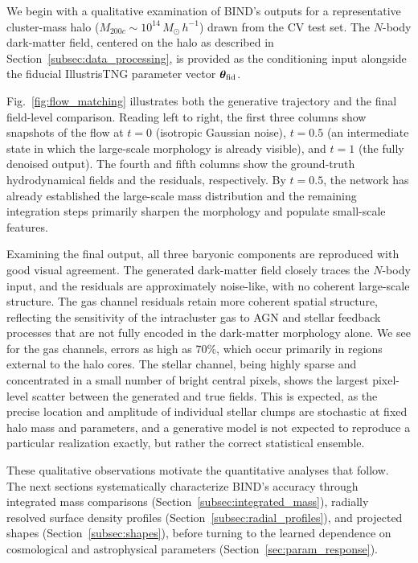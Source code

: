 \documentclass[linenumbers,trackchanges, twocolumn]{aastex701}
\begin{document}
We begin with a qualitative examination of \textsc{BIND}'s outputs for a representative cluster-mass halo ($M_{200c} \sim 10^{14}\,M_{\odot}\, h^{-1}$) drawn from the CV test set. The $N$-body dark-matter field, centered on the halo as described in Section~\ref{subsec:data_processing}, is provided as the conditioning input alongside the fiducial IllustrisTNG parameter vector $\boldsymbol{\theta}_{\rm fid}$.

Fig.~\ref{fig:flow_matching} illustrates both the generative trajectory and the final field-level comparison. Reading left to right, the first three columns show snapshots of the flow at $t=0$ (isotropic Gaussian noise), $t=0.5$ (an intermediate state in which the large-scale morphology is already visible), and $t=1$ (the fully denoised output). The fourth and fifth columns show the ground-truth hydrodynamical fields and the residuals, respectively. By $t=0.5$, the network has already established the large-scale mass distribution and the remaining integration steps primarily sharpen the morphology and populate small-scale features.

Examining the final output, all three baryonic components are reproduced with good visual agreement. The generated dark-matter field closely traces the $N$-body input, and the residuals are approximately noise-like, with no coherent large-scale structure. The gas channel residuals retain more coherent spatial structure, reflecting the sensitivity of the intracluster gas to AGN and stellar feedback processes that are not fully encoded in the dark-matter morphology alone. We see for the gas channels, errors as high as $70\%$, which occur primarily in regions external to the halo cores. The stellar channel, being highly sparse and concentrated in a small number of bright central pixels, shows the largest pixel-level scatter between the generated and true fields. This is expected, as the precise location and amplitude of individual stellar clumps are stochastic at fixed halo mass and parameters, and a generative model is not expected to reproduce a particular realization exactly, but rather the correct statistical ensemble.

These qualitative observations motivate the quantitative analyses that follow. The next sections systematically characterize \textsc{BIND}'s accuracy through integrated mass comparisons (Section~\ref{subsec:integrated_mass}), radially resolved surface density profiles (Section~\ref{subsec:radial_profiles}), and projected shapes (Section~\ref{subsec:shapes}), before turning to the learned dependence on cosmological and astrophysical parameters (Section~\ref{sec:param_response}).
\end{document}
